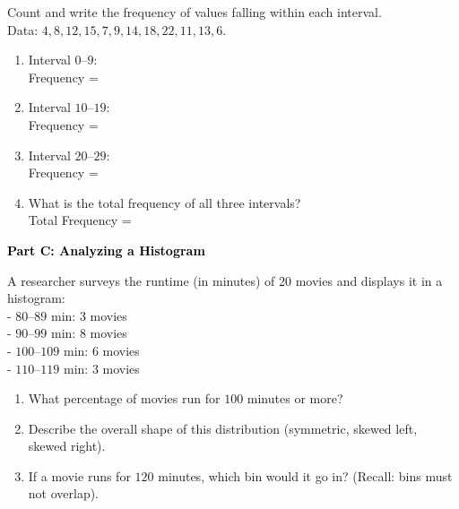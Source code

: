 \documentclass[12pt, letterpaper, fleqn]{article}
\newcommand{\blanklong}{\underline{\hspace{6.5cm}}}
\newcommand{\blankshorter}{\underline{\hspace{1.5cm}}}
\begin{document}
\noindent
Count and write the frequency of values falling within each interval. \\
Data: $4, 8, 12, 15, 7, 9, 14, 18, 22, 11, 13, 6$.

\vspace{5mm}

\begin{enumerate}[itemsep=2.2cm, leftmargin=0.6cm]
\item Interval $0\text{--}9$: \\
Frequency = \blankshorter

\item Interval $10\text{--}19$: \\
Frequency = \blankshorter

\item Interval $20\text{--}29$: \\
Frequency = \blankshorter

\item What is the total frequency of all three intervals? \\
Total Frequency = \blankshorter
\end{enumerate}

\newpage

\begin{tcolorbox}[colback=black!10]
    \large\textcolor{black}{\textbf{Part C: Analyzing a Histogram}}
\end{tcolorbox}

\vspace{3mm}

\noindent
A researcher surveys the runtime (in minutes) of 20 movies and displays it in a histogram: \\
- $80\text{--}89$ min: 3 movies \\
- $90\text{--}99$ min: 8 movies \\
- $100\text{--}109$ min: 6 movies \\
- $110\text{--}119$ min: 3 movies

\vspace{5mm}

\begin{enumerate}[itemsep=2.5cm, leftmargin=0.6cm]
\item What percentage of movies run for $100$ minutes or more? \\
\blanklong

\item Describe the overall shape of this distribution (symmetric, skewed left, skewed right). \\
\blanklong

\item If a movie runs for $120$ minutes, which bin would it go in? (Recall: bins must not overlap). \\
\blanklong
\end{enumerate}
\end{document}
